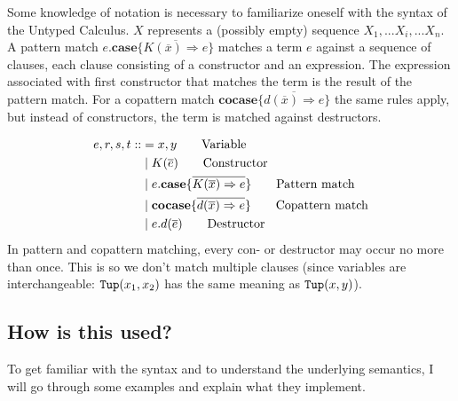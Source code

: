 \documentclass[twoside,12pt,a4paper]{article}
\begin{document}

Some knowledge of notation is necessary to familiarize oneself with the syntax of the Untyped Calculus.
$X$ represents a (possibly empty) sequence $X_1, ... X_i, ... X_n$.  
\\
A pattern match $e.\textbf{case}\{\overline{K(\overline{x})\Rightarrow e}\}$ 
matches a term $e$ against a sequence of clauses, each clause consisting of a constructor and an expression.
The expression associated with first constructor %
that matches the term is the result of the pattern match. %
For a copattern match $\textbf{cocase} \{\overline{d(\overline{x}) \Rightarrow e}\}$
the same rules apply, but instead of constructors, the term is matched against destructors.

\begin{definition}
    \begin{align*}
    e,r,s,t ::&=  x,y  \tag*{Variable} \\
        &\;|\;K(\overline{e}) \tag*{Constructor} \\
        &\;|\;e.\textbf{case}\{\overline{K(\overline{x})\Rightarrow e}\}  \tag*{Pattern match}\\
        &\;|\;\textbf{cocase}\{\overline{d(\overline{x})\Rightarrow e}\}  \tag*{Copattern match}\\
        &\;|\;e.d(\overline{e})  \tag*{Destructor}
    \end{align*}
    In pattern and copattern matching, every con- or destructor may occur no more than once.
    This is so we don't match multiple clauses (since variables are interchangeable: $\mathtt{Tup(}x_1, x_2\mathtt{)}$ has the same meaning as $\mathtt{Tup(}x, y\mathtt{)}$).
\end{definition}
\iffalse$x, y \in$ \textsc{Var}, $\constructor \in$\textsc{CtorDtorName} $\lor$ \textsc{TypeName}, $\destructor \in$\textsc{CtorDtorName}.
\fi %
\subsection{How is this used?}

To get familiar with the syntax and to understand the underlying semantics, I will go through some examples and explain what they implement.
\end{document}
